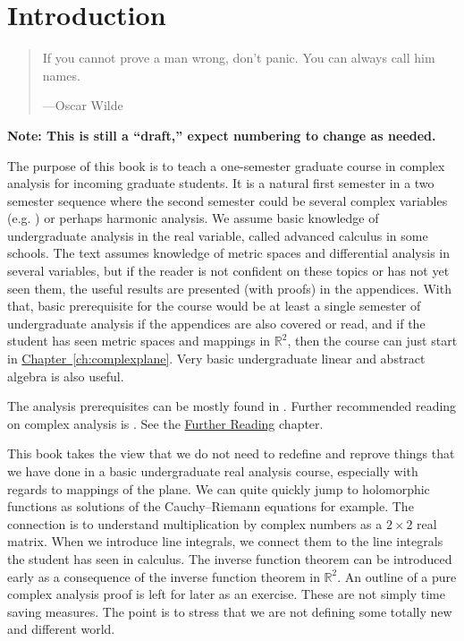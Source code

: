 \documentclass[12pt,openany]{book}
\newcommand{\R}{{\mathbb{R}}}
\theoremstyle{plain}
\theoremstyle{remark}
\theoremstyle{definition}
\newenvironment{myquote}{%
    \begin{quote}%
    \begingroup\itshape
}{%
    \endgroup%
    \end{quote}
}
\theoremstyle{exercise}
\theoremstyle{example}
\newcommand{\Chapterref}[1]{\hyperref[#1]{Chapter~\ref*{#1}}}
\begin{document}
\chapter*{Introduction} \label{ch:intro}

\begin{myquote}
If you cannot prove a man wrong, don't panic. You can always call him names.

---Oscar Wilde 
\end{myquote}

\noindent
\hfill\textbf{Note: This is still a ``draft,'' expect numbering to change as
needed.}\hfill
\medskip

The purpose of this book is to teach a one-semester graduate course in
complex analysis for incoming graduate students.
It is a natural first semester in a two semester sequence where the second
semester could be several complex variables (e.g. \cite{scv:book})
or perhaps harmonic analysis.
We assume basic knowledge of undergraduate
analysis in the real variable, called advanced calculus in some schools.
The text assumes knowledge of metric spaces
and differential analysis in several variables, but if the reader is not
confident on these topics or has not yet seen them, the useful results
are presented (with proofs) in the appendices.
With that, basic prerequisite for the
course would be at least a single semester of undergraduate analysis if the
appendices are also covered or read, and if the student has
seen metric spaces and mappings in $\R^2$, then the course
can just start in \Chapterref{ch:complexplane}.  Very basic undergraduate
linear and abstract algebra is also useful.

The analysis prerequisites can be mostly found in
\cites{ra:book,ra:book2,Rudin:principles}.  Further recommended
reading on complex analysis is \cites{Boas,Conway1,Conway2,Rudin,Ullrich}.
See the
\hyperref[ch:furtherreading]{Further Reading} chapter.

This book takes the view that we do not need to redefine and reprove
things that we have done in a basic undergraduate real analysis course,
especially with
regards to mappings of the plane.  We can quite quickly jump to
holomorphic functions as solutions of the Cauchy--Riemann equations for
example.
The connection is to understand multiplication by complex numbers
as a $2 \times 2$ real matrix.
When we introduce line integrals, we connect
them to the line integrals the student has seen in calculus.
The inverse function theorem can be introduced early as
a consequence of the inverse function theorem in $\R^2$.
An outline of a pure complex analysis proof is left for later as an exercise.
These are not simply time saving measures.
The point is to stress that we are not defining some totally new and
different world.
\end{document}
